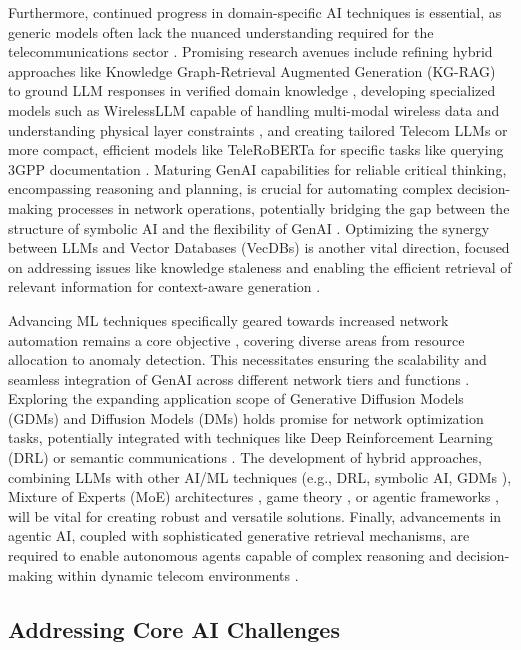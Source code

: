 \documentclass[sigconf]{acmart}
\begin{document}
Furthermore, continued progress in domain-specific AI techniques is essential, as generic models often lack the nuanced understanding required for the telecommunications sector \cite{ref4, ref17}. Promising research avenues include refining hybrid approaches like Knowledge Graph-Retrieval Augmented Generation (KG-RAG) to ground LLM responses in verified domain knowledge \cite{ref4}, developing specialized models such as WirelessLLM capable of handling multi-modal wireless data and understanding physical layer constraints \cite{ref17}, and creating tailored Telecom LLMs \cite{ref25} or more compact, efficient models like TeleRoBERTa for specific tasks like querying 3GPP documentation \cite{ref18}. Maturing GenAI capabilities for reliable critical thinking, encompassing reasoning and planning, is crucial for automating complex decision-making processes in network operations, potentially bridging the gap between the structure of symbolic AI and the flexibility of GenAI \cite{ref6}. Optimizing the synergy between LLMs and Vector Databases (VecDBs) is another vital direction, focused on addressing issues like knowledge staleness and enabling the efficient retrieval of relevant information for context-aware generation \cite{ref8, ref14}.

Advancing ML techniques specifically geared towards increased network automation remains a core objective \cite{ref12}, covering diverse areas from resource allocation to anomaly detection. This necessitates ensuring the scalability and seamless integration of GenAI across different network tiers and functions \cite{ref14, ref15, ref25, ref31}. Exploring the expanding application scope of Generative Diffusion Models (GDMs) and Diffusion Models (DMs) holds promise for network optimization tasks, potentially integrated with techniques like Deep Reinforcement Learning (DRL) or semantic communications \cite{ref19, ref33}. The development of hybrid approaches, combining LLMs with other AI/ML techniques (e.g., DRL, symbolic AI, GDMs \cite{ref25}), Mixture of Experts (MoE) architectures \cite{ref20}, game theory \cite{ref21}, or agentic frameworks \cite{ref35}, will be vital for creating robust and versatile solutions. Finally, advancements in agentic AI, coupled with sophisticated generative retrieval mechanisms, are required to enable autonomous agents capable of complex reasoning and decision-making within dynamic telecom environments \cite{ref35}.

\subsection{Addressing Core AI Challenges}
\end{document}

